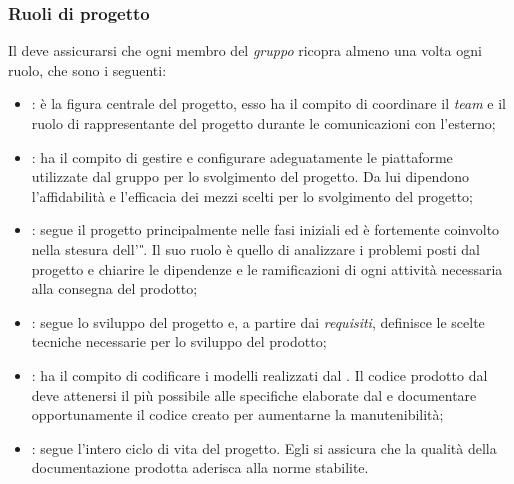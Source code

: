 \subsubsection{Ruoli di progetto} %
Il \RdP{} deve assicurarsi che ogni membro del \emph{gruppo} ricopra almeno una volta ogni ruolo, che sono i seguenti:
	\begin{itemize}
		\item \textbf{\RdP}: è la figura centrale del progetto, esso ha il compito di coordinare il \emph{team} e il ruolo di rappresentante del progetto durante le comunicazioni con l'esterno;
		\item \textbf{\Amm}: ha il compito di gestire e configurare adeguatamente le piattaforme utilizzate dal gruppo per lo svolgimento del progetto. Da lui dipendono l'affidabilità e l'efficacia dei mezzi scelti per lo svolgimento del progetto;
		\item \textbf{\Ana}: segue il progetto principalmente nelle fasi iniziali ed è fortemente coinvolto nella stesura dell' \AdR{}\textit{\G}. Il suo ruolo è quello di analizzare i problemi posti dal progetto e chiarire le dipendenze e le ramificazioni di ogni attività necessaria alla consegna del prodotto;
		\item \textbf{\Prog}: segue lo sviluppo del progetto e, a partire dai \emph{requisiti}, definisce le scelte tecniche necessarie per lo sviluppo del prodotto;
		\item \textbf{\Progm}: ha il compito di codificare i modelli realizzati dal \Prog{}. Il codice prodotto dal \Progm{} deve attenersi il più possibile alle specifiche elaborate dal \Prog{} e documentare opportunamente il codice creato per aumentarne la manutenibilità;
		\item \textbf{\Ver}: segue l'intero ciclo di vita del progetto. Egli si assicura che la qualità della documentazione prodotta aderisca alla norme stabilite.
	\end{itemize}

